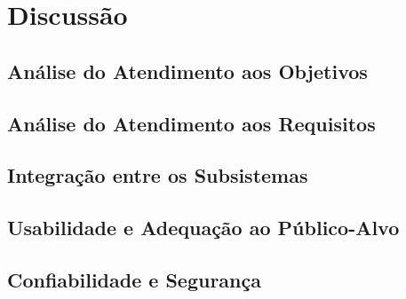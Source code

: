 
\chapter{Discussão}
\label{chap:discussao}


\section{Análise do Atendimento aos Objetivos}
\label{sec:analise-objetivos}


\section{Análise do Atendimento aos Requisitos}
\label{sec:analise-requisitos}


\section{Integração entre os Subsistemas}
\label{sec:discussao-integracao}


\section{Usabilidade e Adequação ao Público-Alvo}
\label{sec:discussao-usabilidade}


\section{Confiabilidade e Segurança}
\label{sec:discussao-confiabilidade}

